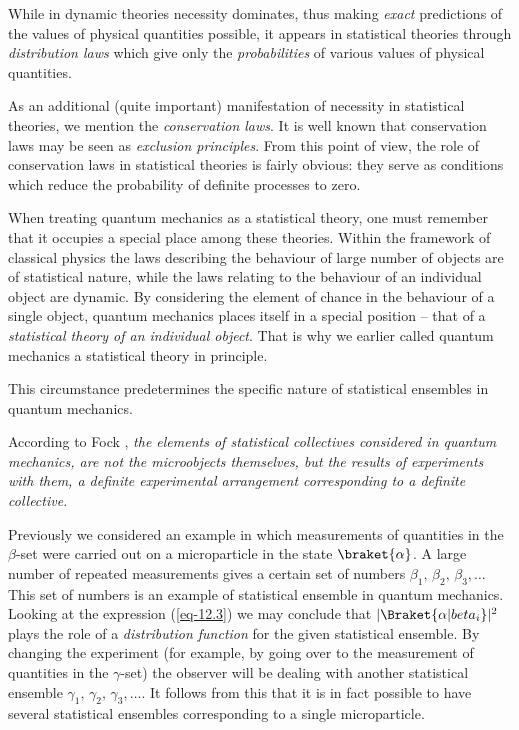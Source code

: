 \documentclass[a4paper,sfsidenotes,colorlinks=true]{tufte-book}
\numberwithin{equation}{section}
\numberwithin{figure}{section}
\begin{document}
While in dynamic theories necessity dominates, thus making \emph{exact}
predictions of the values of physical quantities possible, it
appears in statistical theories through \emph{distribution laws} which give
only the \emph{probabilities} of various values of physical quantities.


As an additional (quite important) manifestation of necessity in
statistical theories, we mention the \emph{conservation laws}. It is well
known that conservation laws may be seen as \emph{exclusion principles}. From
this point of view, the role of conservation laws in statistical
theories is fairly obvious: they serve as conditions which reduce the
probability of definite processes to zero.


When  treating
quantum mechanics as a statistical theory, one must remember that it
occupies a special place among these theories. Within the framework of
classical physics the laws describing the behaviour of large number of
objects are of statistical nature, while the laws relating to the
behaviour of an individual object are dynamic. By considering the
element of chance in the behaviour of a single object, quantum
mechanics places itself in a special position -- that of a \emph{statistical
theory of an individual object}. That is why we earlier called quantum
mechanics a statistical theory in principle.

This circumstance predetermines the specific nature of statistical
ensembles in quantum mechanics.

According to Fock \cite{fock-1957}, \emph{the elements of statistical collectives
considered in quantum mechanics, are not the microobjects themselves,
but the results of experiments with them, a definite experimental
arrangement corresponding to a definite collective.}


Previously we considered an example in which measurements of
quantities in the $\beta$-set were carried out on a microparticle in
the state $\braket{\alpha}$. A large number of repeated measurements
gives a certain set of numbers $\beta_{1}, \, \beta_{2}, \, \beta_{3},
\ldots$ This set of numbers is an example of statistical ensemble in
quantum mechanics. Looking at the expression (\ref{eq-12.3}) we may
conclude that $|\Braket{\alpha | beta_{i}}|^{2}$ plays the role of a
\emph{distribution function} for the given statistical ensemble. By
changing the experiment (for example, by going over to the measurement
of quantities in the $\gamma$-set) the observer will be dealing with
another statistical ensemble $\gamma_{1}, \, \gamma_{2}, \,
\gamma_{3}, \ldots$. It follows from this that it is in fact possible
to have several statistical ensembles corresponding to a single
microparticle.
\end{document}
